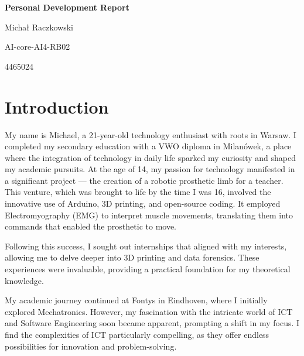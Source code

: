 \documentclass[a4paper, 11pt]{article}
\begin{document}
\begin{titlepage}
  \thispagestyle{titlepage}

  \begin{center} 
    \end{center}


	\setlength{\parindent}{0pt}
	\vspace*{.15\textheight}
	\medbreak
	{\Huge\bfseries\color{MSBlue} Personal Development Report
    \par}
	\bigbreak
    \bigbreak
	{Michał Raczkowski\par}
    \smallbreak
    {\small AI-core-AI4-RB02 \par}
    \smallbreak
    {\small 4465024\par}
\end{titlepage}



\pagebreak


\tableofcontents




\pagebreak

\section{Introduction}
My name is Michael, a 21-year-old technology enthusiast with roots in Warsaw. I completed my secondary education with a VWO diploma in Milanówek, a place where the integration of technology in daily life sparked my curiosity and shaped my academic pursuits.
\medbreak
At the age of 14, my passion for technology manifested in a significant project — the creation of a robotic prosthetic limb for a teacher. This venture, which was brought to life by the time I was 16, involved the innovative use of Arduino, 3D printing, and open-source coding. It employed Electromyography (EMG) to interpret muscle movements, translating them into commands that enabled the prosthetic to move.
\medbreak

Following this success, I sought out internships that aligned with my interests, allowing me to delve deeper into 3D printing and data forensics. These experiences were invaluable, providing a practical foundation for my theoretical knowledge.
\medbreak

My academic journey continued at Fontys in Eindhoven, where I initially explored Mechatronics. However, my fascination with the intricate world of ICT and Software Engineering soon became apparent, prompting a shift in my focus. I find the complexities of ICT particularly compelling, as they offer endless possibilities for innovation and problem-solving.
\medbreak
\end{document}
